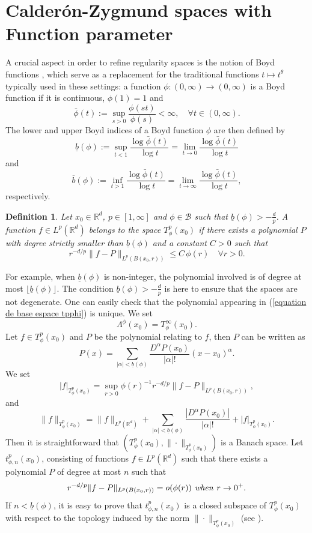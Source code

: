 \documentclass[a4paper,10pt]{article}
\theoremstyle{thmstyleone}%
\theoremstyle{thmstyletwo}%
\theoremstyle{thmstylethree}%
\newtheorem{definition}{Definition}%
\begin{document}
\section{Calder\'on-Zygmund spaces with Function parameter}\label{sec2}

A crucial aspect in order to refine regularity spaces is the notion of Boyd functions \cite{Boyd:67,Boyd:69,Johnson:79,Krein:82,Merucci:84, Lamby:22, Lamby:24}, which serve as a replacement for the traditional functions $t \mapsto t^\theta$ typically used in these settings: a function $\phi : (0, \infty) \to (0, \infty)$ is a Boyd function if it is continuous, $\phi(1) = 1$ and 
\[
\overline{\phi} (t) := \sup_{s>0} \frac{\phi(st)}{\phi(s)} < \infty, \quad \forall t \in (0, \infty).
\]
The lower and upper Boyd indices of a Boyd function $\phi$ are then defined by
\[
 \underline{b}(\phi):=\sup_{t<1} \frac{\log \bar \phi(t)}{\log t} = \lim_{t\to 0} \frac{\log \bar \phi(t)}{\log t}
\]
and
\[
 \overline{b}(\phi):=\inf_{t>1} \frac{\log \bar \phi(t)}{\log t} = \lim_{t\to \infty} \frac{\log \bar \phi(t)}{\log t},
\]
respectively.




\begin{definition}\label{def T^p_phi(x_0)}
Let $x_0\in\mathbb{R}^d$, $p\in[1,\infty]$ and $\phi\in\mathcal{B}$ such that $\underline{b}(\phi)>-\frac{d}{p}$. A function $f\in L^p(\mathbb{R}^d)$ belongs to the space $T^p_\phi(x_0)$ if there exists a polynomial $P$ with degree strictly smaller than $\underline{b}(\phi)$ and a constant $C>0$ such that
\begin{equation}\label{equation de base espace tpphi}
r^{-d/p}\|f-P\|_{L^p(B(x_0,r))}\leq C\,\phi(r)\quad\forall r>0.
\end{equation}
\end{definition}
For example, when $\underline{b}(\phi)$ is non-integer, the polynomial involved is of degree at most $\lfloor \underline{b}(\phi)\rfloor$.
The condition $\underline{b}(\phi)>-\frac{d}{p}$ is here to ensure that the spaces are not degenerate. One can easily check that the polynomial appearing in (\ref{equation de base espace tpphi}) is unique. We set 
\[\Lambda^\phi(x_0)=T^\infty_\phi(x_0).\]
Let $f\in T^p_\phi(x_0)$ and $P$ be the polynomial relating to $f$, then $P$ can be written as
\[P(x)=\sum_{|\alpha|<\underline{b}(\phi)}\frac{D^\alpha P(x_0)}{|\alpha| !}(x-x_0)^\alpha.\]
We set
\[|f|_{T^p_\phi(x_0)}=\sup_{r>0}\phi(r)^{-1}r^{-d/p}\|f-P\|_{L^p(B(x_0,r))},\]
and
\[\|f\|_{T^p_\phi(x_0)}=\|f\|_{L^p(\mathbb{R}^d)}+\sum_{|\alpha|<\underline{b}(\phi)}\frac{|D^\alpha P(x_0)|}{|\alpha| !}+|f|_{T^p_\phi(x_0)}.\]
Then it is straightforward that $(T^p_\phi(x_0),\|\cdot\|_{T^p_\phi(x_0)})$ is a Banach space. Let $t^p_{\phi,n}(x_0)$, consisting of functions $f\in L^p(\mathbb{R}^d)$ such that there exists a polynomial $P$ of degree at most $n$ such that
\[r^{-d/p}\|f-P\|_{L^p(B(x_0,r))}=o(\phi(r))\text{\emph{ when }} r\rightarrow 0^+.\]
If $n<\underline{b}(\phi)$, it is easy to prove that $t^p_{\phi,n}(x_0)$ is a closed subspace of $T^p_{\phi}(x_0)$ with respect to the topology induced by the norm $\|\cdot\|_{T^p_{\phi}(x_0)}$ (see \cite{Loosveldt:20}). 
\end{document}
